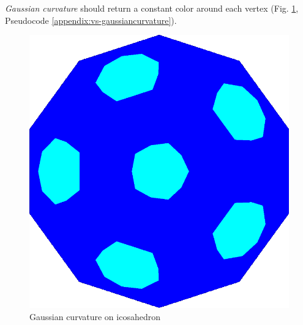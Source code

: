 \textit{Gaussian curvature} should return a constant color around each vertex (Fig. \ref{fig:gc-icosahedron}, Pseudocode \ref{appendix:vs-gaussiancurvature}).
\begin{figure}[h]
    \centering
    \includegraphics[scale=0.2]{images/gaussian-ball.png}
    \caption{Gaussian curvature on icosahedron}\label{fig:gc-icosahedron}
\end{figure}


